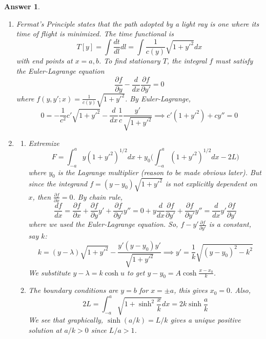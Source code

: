 \documentclass[a4paper]{article}
\newtheorem{ans}{Answer}[section]
\theoremstyle{new}
\begin{document}
\begin{ans}\leavevmode
\begin{enumerate}[label=(\alph*)]
\item Fermat's Principle states that the path adopted by a light ray is one where its time of flight is minimized. The time functional is
$$T[y]=\int\frac{dt}{dl}dl=\int\frac{1}{c(y)}\sqrt{1+y'^2}dx$$
with end points at $x=a,b$. To find stationary $T$, the integral $f$ must satisfy the Euler-Lagrange equation
$$\frac{\partial f}{\partial y}-\frac{d}{dx}\frac{\partial f}{\partial y'}=0$$
where $f(y,y';x)=\frac{1}{c(y)}\sqrt{1+y'^2}$. By Euler-Lagrange,
$$0=-\frac{1}{c^2}c'\sqrt{1+y'^2}-\frac{d}{dx}\frac{1}{c}\frac{y'}{\sqrt{1+y'^2}}\implies c'(1+y'^2)+cy''=0$$
\item
\begin{enumerate}[label=(\roman*)]
\item Extremize
$$F=\int_{-a}^ay(1+y'^2)^{1/2}dx+y_0\bigg(\int_{-a}^a(1+y'^2)^{1/2}dx-2L\bigg)$$
where $y_0$ is the Lagrange multiplier (reason to be made obvious later). But since the integrand $f=(y-y_0)\sqrt{1+y'^2}$ is not explicitly dependent on $x$, then $\frac{\partial f}{\partial x}=0$. By chain rule,
$$\frac{df}{dx}=\frac{\partial f}{\partial x}+\frac{\partial f}{\partial y}y'+\frac{\partial f}{\partial y'}y''=0+y\frac{d}{dx}\frac{\partial f}{\partial y'}+\frac{\partial f}{\partial y'}y''=\frac{d}{dx}y'\frac{\partial f}{\partial y'}$$
where we used the Euler-Lagrange equation. So, $f-y'\frac{\partial f}{\partial y'}$ is a constant, say $k$:
$$k=(y-\lambda)\sqrt{1+y'^2}-\frac{y'(y-y_0)y'}{\sqrt{1+y'^2}}\implies y'=\frac{1}{k}\sqrt{(y-y_0)^2-k^2}$$
We substitute $y-\lambda=k\cosh u$ to get $y-y_0=A\cosh\frac{x-x_0}{k}$.
\item The boundary conditions are $y=b$ for $x=\pm a$, this gives $x_0=0$. Also,
$$2L=\int_{-a}^a\sqrt{1+\sinh^2\frac{x}{k}}dx=2k\sinh\frac{a}{k}$$
We see that graphically, $\sinh(a/k)=L/k$ gives a unique positive solution at $a/k>0$ since $L/a>1$.
\end{enumerate}
\end{enumerate}
\begin{center}
\end{center}
\end{ans}
\end{document}
